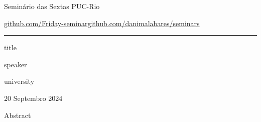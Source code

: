 


\begin{minipage}{\textwidth}
	\begin{minipage}{1\textwidth}
		Semin\'ario das Sextas \hfill PUC-Rio
		
		{\small\href{https://github.com/Friday-seminar/}{github.com/Friday-seminar}\hfill\href{https://github.com/danimalabares/seminars}{github.com/danimalabares/seminars}}
		\end{minipage}
\end{minipage}\vspace{.2cm}\hrule

\vspace{10pt}

{\Huge title}

\hfill{\Large speaker}

\hfill{\Large university}

\hfill{\large 20 Septembro 2024}

\begin{thing7}{Abstract}\leavevmode
	
\end{thing7}

\tableofcontents



